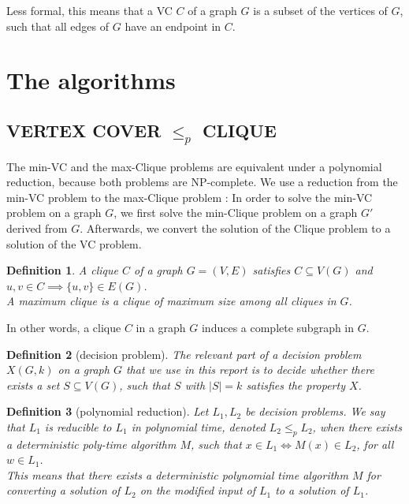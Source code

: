 \documentclass[11pt,a4paper]{article}
\newtheorem*{definition}{Definition}
\begin{document}
Less formal, this means that a VC $C$ of a graph $G$ is a subset of the vertices of $G$, such that all edges of $G$ have an endpoint in $C$. \\


\section{The algorithms}

\subsection{VERTEX COVER $\leq_{p}$ CLIQUE}

The min-VC and the max-Clique problems are equivalent under a polynomial reduction, because both problems are NP-complete. We use a reduction from the min-VC problem to the max-Clique problem \cite{Patric}: In order to solve the min-VC problem on a graph $G$, we first solve the min-Clique problem on a graph $G'$ derived from $G$. Afterwards, we convert the solution of the Clique problem to a solution of the VC problem.  

\begin{definition}
A \emph{clique} $C$ of a graph $G=(V,E)$ satisfies $C \subseteq V(G)$ and $u, v \in C \implies \{u, v\} \in E(G)$. \\

A \emph{maximum clique} is a clique of maximum size among all cliques in $G$.
\end{definition}

In other words, a clique $C$ in a graph $G$ induces a complete subgraph in $G$. \\

\begin{definition}[decision problem]
The relevant part of a decision problem $X(G,k)$ on a graph $G$ that we use in this report is to decide whether there exists a set $S \subseteq V(G)$, such that $S$ with $|S| = k$ satisfies the property $X$. 
\end{definition}

\begin{definition}[polynomial reduction]
Let $L_{1}, L_{2}$ be decision problems. We say that $L_{1}$ is reducible to $L_{1}$ in polynomial time, denoted $L_{2} \leq_{p} L_{2}$, when there exists a deterministic poly-time algorithm $M$, such that $x \in L_{1} \iff M(x) \in L_{2}$, for all $w \in L_{1}$. \\

This means that there exists a deterministic polynomial time algorithm $M$ for converting a solution of $L_{2}$ on the modified input of $L_{1}$ to a solution of $L_{1}$. 
\end{definition}
\end{document}
